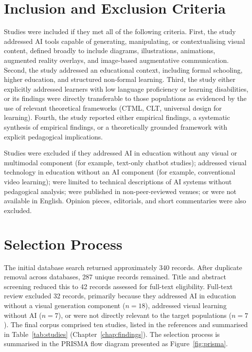 \section{Inclusion and Exclusion Criteria}

Studies were included if they met all of the following criteria. First, the study addressed AI tools capable of generating, manipulating, or contextualising visual content, defined broadly to include diagrams, illustrations, animations, augmented reality overlays, and image-based augmentative communication. Second, the study addressed an educational context, including formal schooling, higher education, and structured non-formal learning. Third, the study either explicitly addressed learners with low language proficiency or learning disabilities, or its findings were directly transferable to those populations as evidenced by the use of relevant theoretical frameworks (CTML, CLT, universal design for learning). Fourth, the study reported either empirical findings, a systematic synthesis of empirical findings, or a theoretically grounded framework with explicit pedagogical implications.

Studies were excluded if they addressed AI in education without any visual or multimodal component (for example, text-only chatbot studies); addressed visual technology in education without an AI component (for example, conventional video learning); were limited to technical descriptions of AI systems without pedagogical analysis; were published in non-peer-reviewed venues; or were not available in English. Opinion pieces, editorials, and short commentaries were also excluded.

\section{Selection Process}

The initial database search returned approximately 340 records. After duplicate removal across databases, 287 unique records remained. Title and abstract screening reduced this to 42 records assessed for full-text eligibility. Full-text review excluded 32 records, primarily because they addressed AI in education without a visual generation component ($n=18$), addressed visual learning without AI ($n=7$), or were not directly relevant to the target populations ($n=7$). The final corpus comprised ten studies, listed in the references and summarised in Table~\ref{tab:studies} (Chapter~\ref{chap:findings}). The selection process is summarised in the PRISMA flow diagram presented as Figure~\ref{fig:prisma}.

